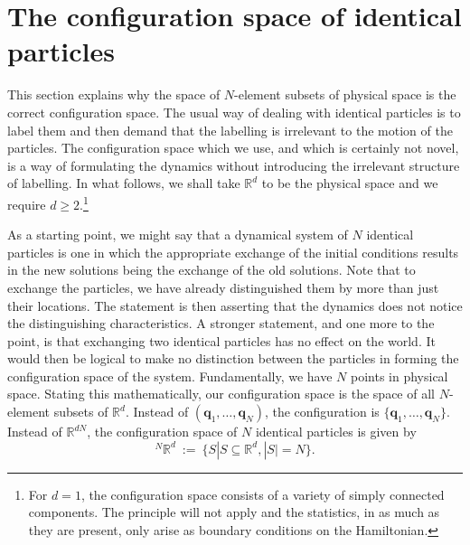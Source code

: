 \documentclass[11pt]{article}
\theoremstyle{remark}
\begin{document}
\section{The configuration space of identical particles} \label{s:nat}


This section explains why
the space of $N$-element subsets of physical space is the correct
configuration space. The usual way of dealing with identical particles
is to label them and then demand that the labelling is irrelevant to
the motion of the particles. The configuration space which we use, and
which is certainly not novel, is a way of formulating the dynamics
without introducing the irrelevant structure of labelling.  In what
follows, we shall take $\ensuremath{\mathbb{R}^{\ensuremath{d}}}$ to be the physical space and we
require $\ensuremath{d} \geq 2$.\footnote{For $\ensuremath{d} =1$, the configuration space
consists of a variety of simply connected components. The principle
will not apply and the statistics, in as much as they are present, 
 only arise as boundary conditions on the Hamiltonian.}


As a starting point,  we might say that a 
 dynamical system of $N$ identical particles is one in which the
appropriate exchange
of the initial 
conditions results in the new solutions being the exchange of the old
solutions.  
Note that to exchange the particles, we have already
distinguished them by more than just their locations. The statement is
then asserting that the dynamics does not notice the distinguishing
characteristics. A stronger statement, and one more to the point, is
 that
exchanging two identical particles has no effect on the world. 
It would then be logical to make no distinction between the particles
in forming the configuration space of the system. 
Fundamentally, we have $N$ points in
physical space. 
Stating this mathematically, our configuration space is 
the space of all $N$-element subsets of \ensuremath{\mathbb{R}^{\ensuremath{d}}}.  Instead of 
\ensuremath{(\boldsymbol{q}_1,\ldots,\boldsymbol{q}_N)}, the configuration is  
\ensuremath{\{\boldsymbol{q}_1,\ldots,\boldsymbol{q}_N\}}. Instead of \ensuremath{\mathbb{R}^{\ensuremath{d} N}}, the  configuration space of $N$
identical particles is given by 
\begin{equation*}
\ensuremath{{}^N\ensuremath{\mathbb{R}^{\ensuremath{d}}}} \  \ensuremath{:=} \ \ensuremath{\{S|S \subseteq \ensuremath{\mathbb{R}^{\ensuremath{d}}}, |S| = N \}}. 
\end{equation*}
\end{document}
